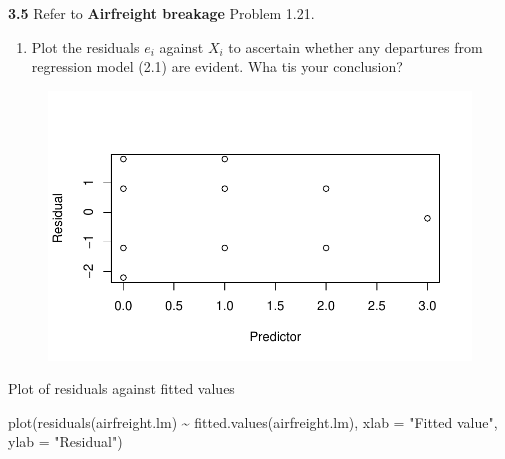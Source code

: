 \documentclass[
  letterpaper,
  DIV=11,
  numbers=noendperiod]{scrartcl}
\newenvironment{Shaded}{\begin{snugshade}}{\end{snugshade}}
\newcommand{\AttributeTok}[1]{\textcolor[rgb]{0.40,0.45,0.13}{#1}}
\newcommand{\FunctionTok}[1]{\textcolor[rgb]{0.28,0.35,0.67}{#1}}
\newcommand{\NormalTok}[1]{\textcolor[rgb]{0.00,0.23,0.31}{#1}}
\newcommand{\SpecialCharTok}[1]{\textcolor[rgb]{0.37,0.37,0.37}{#1}}
\newcommand{\StringTok}[1]{\textcolor[rgb]{0.13,0.47,0.30}{#1}}
\providecommand{\tightlist}{%
  \setlength{\itemsep}{0pt}\setlength{\parskip}{0pt}}\usepackage{longtable,booktabs,array}
\begin{document}
\textbf{3.5} Refer to \textbf{Airfreight breakage} Problem 1.21.

\begin{enumerate}
\def\labelenumi{\alph{enumi}.}
\setcounter{enumi}{3}
\tightlist
\item
  Plot the residuals \(e_{i}\) against \(X_{i}\) to ascertain whether
  any departures from regression model (2.1) are evident. Wha tis your
  conclusion?
\end{enumerate}

\begin{Shaded}
\end{Shaded}

\begin{figure}[H]

{\centering \includegraphics{sta9700_ch3_hw_files/figure-pdf/unnamed-chunk-7-1.pdf}

}

\end{figure}

Plot of residuals against fitted values

\begin{Shaded}
\begin{Highlighting}[]
\FunctionTok{plot}\NormalTok{(}\FunctionTok{residuals}\NormalTok{(airfreight.lm) }\SpecialCharTok{\textasciitilde{}} \FunctionTok{fitted.values}\NormalTok{(airfreight.lm),}
     \AttributeTok{xlab =} \StringTok{"Fitted value"}\NormalTok{, }\AttributeTok{ylab =} \StringTok{"Residual"}\NormalTok{)}
\end{Highlighting}
\end{Shaded}
\end{document}
